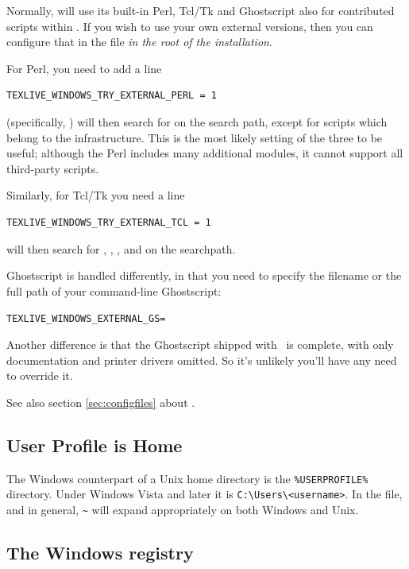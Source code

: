\documentclass[12pt]{article}
\begin{document}
Normally, \TL{} will use its built-in Perl, Tcl/Tk and Ghostscript also
for contributed scripts within \TL. If you wish to use your own external
versions, then you can configure that in the  file
\emph{in the root of the installation}.

For Perl, you need to add a line
\begin{verbatim}
TEXLIVE_WINDOWS_TRY_EXTERNAL_PERL = 1
\end{verbatim}
\TL{} (specifically, ) will then search
for  on the search path, except for scripts which belong
to the \TL{} infrastructure. This is the most likely setting of the
three to be useful; although the \TL{} Perl includes many additional
modules, it cannot support all third-party scripts.

Similarly, for Tcl/Tk you need a line
\begin{verbatim}
TEXLIVE_WINDOWS_TRY_EXTERNAL_TCL = 1
\end{verbatim}
\TL{} will then search for , ,
,  and  on the
searchpath.

Ghostscript is handled differently, in that you need to specify the
filename or the full path of your command-line Ghostscript:
\begin{alltt}
TEXLIVE_WINDOWS_EXTERNAL_GS = 
\end{alltt}
Another difference is that the Ghostscript shipped with \TL\
is complete, with only documentation and printer drivers omitted.  So
it's unlikely you'll have any need to override it.

See also section \ref{sec:configfiles} about .


\subsection{User Profile is Home}
\label{sec:winhome}

The Windows counterpart of a Unix home directory is the
\verb|%USERPROFILE%| directory.  Under Windows Vista and later it is
\verb|C:\Users\<username>|.  In the
 file, and \KPS{} in general, \verb|~| will
expand appropriately on both Windows and Unix.


\subsection{The Windows registry}
\label{sec:registry}
\end{document}
